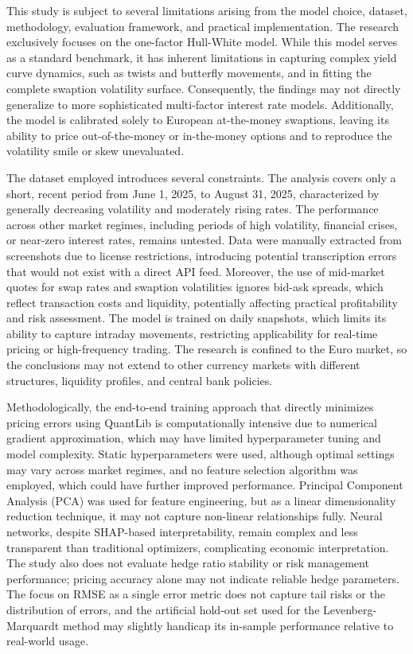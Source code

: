 This study is subject to several limitations arising from the model choice, dataset, methodology, evaluation framework, and practical implementation. The research exclusively focuses on the one-factor Hull-White model. While this model serves as a standard benchmark, it has inherent limitations in capturing complex yield curve dynamics, such as twists and butterfly movements, and in fitting the complete swaption volatility surface. Consequently, the findings may not directly generalize to more sophisticated multi-factor interest rate models. Additionally, the model is calibrated solely to European at-the-money swaptions, leaving its ability to price out-of-the-money or in-the-money options and to reproduce the volatility smile or skew unevaluated.  

The dataset employed introduces several constraints. The analysis covers only a short, recent period from June 1, 2025, to August 31, 2025, characterized by generally decreasing volatility and moderately rising rates. The performance across other market regimes, including periods of high volatility, financial crises, or near-zero interest rates, remains untested. Data were manually extracted from screenshots due to license restrictions, introducing potential transcription errors that would not exist with a direct API feed. Moreover, the use of mid-market quotes for swap rates and swaption volatilities ignores bid-ask spreads, which reflect transaction costs and liquidity, potentially affecting practical profitability and risk assessment. The model is trained on daily snapshots, which limits its ability to capture intraday movements, restricting applicability for real-time pricing or high-frequency trading. The research is confined to the Euro market, so the conclusions may not extend to other currency markets with different structures, liquidity profiles, and central bank policies.  

Methodologically, the end-to-end training approach that directly minimizes pricing errors using QuantLib is computationally intensive due to numerical gradient approximation, which may have limited hyperparameter tuning and model complexity. Static hyperparameters were used, although optimal settings may vary across market regimes, and no feature selection algorithm was employed, which could have further improved performance. Principal Component Analysis (PCA) was used for feature engineering, but as a linear dimensionality reduction technique, it may not capture non-linear relationships fully. Neural networks, despite SHAP-based interpretability, remain complex and less transparent than traditional optimizers, complicating economic interpretation. The study also does not evaluate hedge ratio stability or risk management performance; pricing accuracy alone may not indicate reliable hedge parameters. The focus on RMSE as a single error metric does not capture tail risks or the distribution of errors, and the artificial hold-out set used for the Levenberg-Marquardt method may slightly handicap its in-sample performance relative to real-world usage.  

